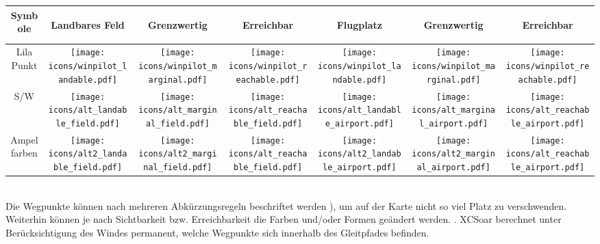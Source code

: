 \begin{tabular}{c|ccc|ccc|}
Symbole
&\begin{sideways}Landbares Feld\end{sideways}
&\begin{sideways}Grenzwertig\end{sideways}
&\begin{sideways}Erreichbar\end{sideways}
&\begin{sideways}Flugplatz\end{sideways}
&\begin{sideways}Grenzwertig\end{sideways}
&\begin{sideways}Erreichbar\end{sideways}\\
\hline
Lila Punkt &
\texttt{[image: icons/winpilot\_landable.pdf]} &
\texttt{[image: icons/winpilot\_marginal.pdf]} &
\texttt{[image: icons/winpilot\_reachable.pdf]} &
\colorbox{white}{\texttt{[image: icons/winpilot\_landable.pdf]}} &
\texttt{[image: icons/winpilot\_marginal.pdf]} &
\texttt{[image: icons/winpilot\_reachable.pdf]} \\
\hline
S/W & 
\texttt{[image: icons/alt\_landable\_field.pdf]} &
\texttt{[image: icons/alt\_marginal\_field.pdf]} &
\texttt{[image: icons/alt\_reachable\_field.pdf]} &
\colorbox[rgb]{0.94,0.94,0.94}{\texttt{[image: icons/alt\_landable\_airport.pdf]}} &
\texttt{[image: icons/alt\_marginal\_airport.pdf]} &
\texttt{[image: icons/alt\_reachable\_airport.pdf]} \\
\hline
Ampelfarben & 
\texttt{[image: icons/alt2\_landable\_field.pdf]} &
\texttt{[image: icons/alt2\_marginal\_field.pdf]} &
\texttt{[image: icons/alt\_reachable\_field.pdf]} &
\colorbox{white}{\texttt{[image: icons/alt2\_landable\_airport.pdf]}} &
\texttt{[image: icons/alt2\_marginal\_airport.pdf]} &
\texttt{[image: icons/alt\_reachable\_airport.pdf]} \\
\hline
\end{tabular} \\

Die Wegpunkte können nach mehreren Abkürzungsregeln beschriftet werden ), um auf der Karte nicht so viel Platz zu verschwenden.  Weiterhin können je nach Sichtbarkeit bzw. Erreichbarkeit die Farben und/oder Formen geändert werden. . \textsf{XCSoar} berechnet unter Berücksichtigung des Windes permanent, welche Wegpunkte sich innerhalb des Gleitpfades befinden.

